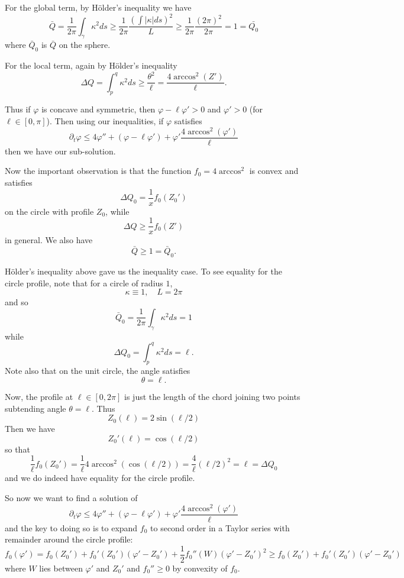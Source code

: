 \documentclass{amsart}
\begin{document}
For the global term, by H\"older's inequality we have
\[
\bar{Q} = \frac{1}{2\pi} \int_{\gamma} \kappa^2 ds \geq \frac{1}{2\pi} \frac{\left(\int |\kappa| ds\right)^2}{L} \geq \frac{1}{2\pi} \frac{(2\pi)^2}{2\pi} = 1 = \bar{Q_0}
\]
where \(\bar{Q}_0\) is \(\bar{Q}\) on the sphere.

For the local term, again by H\"older's inequality
\[
\Delta Q = \int_p^q \kappa^2 ds \geq \frac{\theta^2}{\ell} = \frac{4 \arccos^2(Z')}{\ell}.
\]

Thus if \(\varphi\) is concave and symmetric, then \(\varphi - \ell \varphi' > 0\) and \(\varphi' > 0\) (for \(\ell \in [0, \pi]\)). Then using our inequalities, if \(\varphi\) satisfies
\[
\partial_t \varphi \leq 4 \varphi'' + (\varphi - \ell \varphi') + \varphi' \frac{4 \arccos^2(\varphi')}{\ell}
\]
then we have our sub-solution.

Now the important observation is that the function \(f_0 = 4 \arccos^2\) is convex and satisfies
\[
\Delta Q_0 = \frac{1}{x} f_0(Z_0')
\]
on the circle with profile \(Z_0\), while
\[
\Delta Q \geq \frac{1}{x} f_0(Z')
\]
in general. We also have
\[
\bar{Q} \geq 1 = \bar{Q}_0.
\]

H\"older's inequality above gave us the inequality case. To see equality for the circle profile, note that for a circle of radius \(1\),
\[
\kappa \equiv 1, \quad L = 2\pi
\]
and so
\[
\bar{Q}_0 = \frac{1}{2\pi} \int_{\gamma} \kappa^2 ds = 1
\]
while
\[
\Delta Q_0 = \int_p^q \kappa^2 ds = \ell.
\]
Note also that on the unit circle, the angle satisfies
\[
\theta = \ell.
\]

Now, the profile at \(\ell \in [0, 2\pi]\) is just the length of the chord joining two points subtending angle \(\theta = \ell\). Thus
\[
Z_0(\ell) = 2 \sin(\ell/2)
\]
Then we have
\[
Z_0'(\ell) = \cos(\ell/2)
\]
so that
\[
\frac{1}{\ell} f_0(Z_0') = \frac{1}{\ell} 4 \arccos^2(\cos(\ell/2)) = \frac{4}{\ell} (\ell/2)^2 = \ell = \Delta Q_0
\]
and we do indeed have equality for the circle profile.

So now we want to find a solution of
\[
\partial_t \varphi \leq 4 \varphi'' + (\varphi - \ell \varphi') + \varphi' \frac{4\arccos^2(\varphi')}{\ell}
\]
and the key to doing so is to expand \(f_0\) to second order in a Taylor series with remainder around the circle profile:
\[
f_0(\varphi') = f_0(Z_0') + f_0'(Z_0')(\varphi' - Z_0') + \frac{1}{2} f_0''(W)(\varphi' - Z_0')^2 \geq f_0(Z_0') + f_0'(Z_0')(\varphi' - Z_0')
\]
where \(W\) lies between \(\varphi'\) and \(Z_0'\) and \(f_0''\geq 0\) by convexity of \(f_0\).
\end{document}
